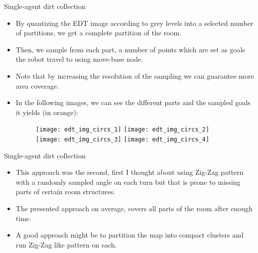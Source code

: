 \documentclass[10pt]{beamer}
\begin{document}
\begin{frame}{Single-agent dirt collection}

\graphicspath{{images/}}
\begin{itemize}
    \item By quantizing the EDT image according to grey levels into a selected number of partitions, we get a complete partition of the room.
    \item Then, we sample from each part, a number of points which are set as goals the robot travel to using move-base node.
    \item Note that by increasing the resolution of the sampling we can guarantee more area coverage.
    \item In the following images, we can see the different parts and the sampled goals it yields (in orange): 
    
    \bigskip
    \begin{figure}[htp]
    \texttt{[image: edt\_img\_circs\_1]}
    \texttt{[image: edt\_img\_circs\_2]}
    \texttt{[image: edt\_img\_circs\_3]}
    \texttt{[image: edt\_img\_circs\_4]}

    \label{fig:galaxy}
\end{figure}
    
\end{itemize}

\end{frame}


\begin{frame}{Single-agent dirt collection}

\begin{itemize}
    \item This approach was the second, first I thought about using Zig-Zag pattern with a randomly sampled angle on each turn but that is prone to missing parts of certain room structures.
    \item The presented approach on average, covers all parts of the room after enough time.
    \item A good approach might be to partition the map into compact clusters and run Zig-Zag like pattern on each.
\end{itemize}

\end{frame}
\end{document}
